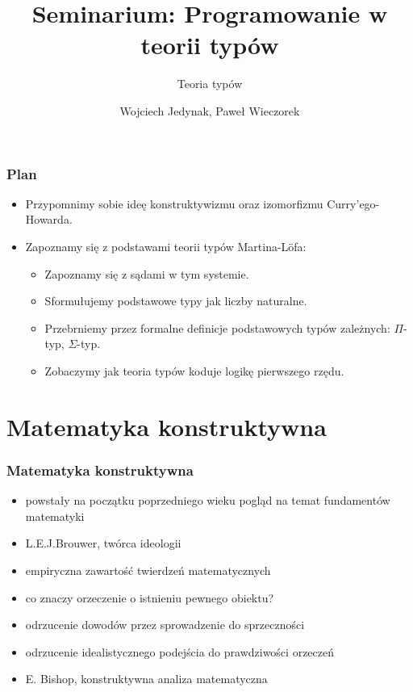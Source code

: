 \documentclass{beamer}
\title{Seminarium: Programowanie w teorii typów}
\subtitle{Teoria typów}
\author{Wojciech Jedynak, Paweł Wieczorek}
\institute{Instytut Informatyki Uniwersytetu Wrocławskiego}
\begin{document}

\maketitle




\begin{frame}
\frametitle{Plan}

\begin{itemize}
 \item Przypomnimy sobie ideę konstruktywizmu oraz izomorfizmu Curry'ego-Howarda.
 \item Zapoznamy się z podstawami teorii typów Martina-L\"{o}fa:
 \begin{itemize}
 \item Zapoznamy się z sądami w tym systemie.
 \item Sformułujemy podstawowe typy jak liczby naturalne.
 \item Przebrniemy przez formalne definicje podstawowych typów zależnych: $\Pi$-typ, $\Sigma$-typ.
 \item Zobaczymy jak teoria typów koduje logikę pierwszego rzędu.
 \end{itemize}
\end{itemize}

\end{frame}

\section{Matematyka konstruktywna}

\begin{frame}
\frametitle{Matematyka konstruktywna}

\begin{itemize}
 \item powstały na początku poprzedniego wieku pogląd na temat fundamentów matematyki
 \item L.E.J.Brouwer, twórca ideologii
 \item empiryczna zawartość twierdzeń matematycznych
 \item co znaczy orzeczenie o istnieniu pewnego obiektu?
 \item odrzucenie dowodów przez sprowadzenie do sprzeczności
 \item odrzucenie idealistycznego podejścia do prawdziwości orzeczeń
 \item E. Bishop, konstruktywna analiza matematyczna
\end{itemize}


\end{frame}
\end{document}
